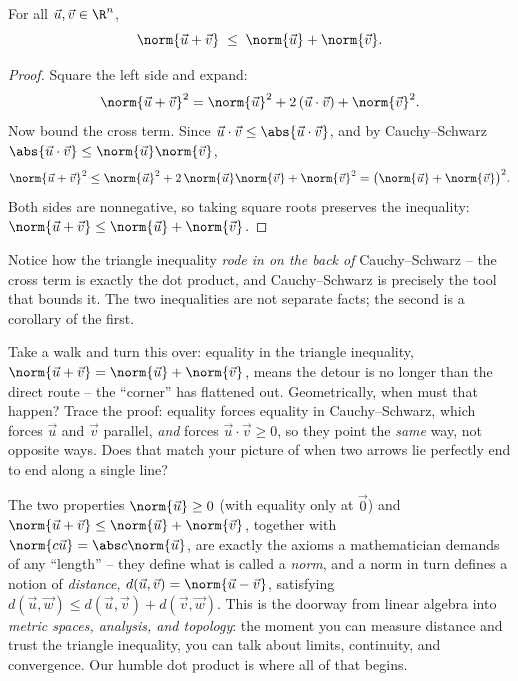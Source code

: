 \begin{theorem}\label{ch04:tri}
For all $\vec u,\vec v\in\R^n$,
\[
  \norm{\vec u + \vec v} \;\le\; \norm{\vec u} + \norm{\vec v}.
\]
\end{theorem}

\begin{proof}
Square the left side and expand:
\[
  \norm{\vec u+\vec v}^2
   = \norm{\vec u}^2 + 2\,(\vec u\cdot\vec v) + \norm{\vec v}^2.
\]
Now bound the cross term. Since $\vec u\cdot\vec v \le \abs{\vec u\cdot\vec v}$, and
by Cauchy--Schwarz $\abs{\vec u\cdot\vec v}\le\norm{\vec u}\norm{\vec v}$,
\[
  \norm{\vec u+\vec v}^2
   \le \norm{\vec u}^2 + 2\,\norm{\vec u}\norm{\vec v} + \norm{\vec v}^2
   = \bigl(\norm{\vec u} + \norm{\vec v}\bigr)^2.
\]
Both sides are nonnegative, so taking square roots preserves the inequality:
$\norm{\vec u+\vec v}\le\norm{\vec u}+\norm{\vec v}$.
\end{proof}

Notice how the triangle inequality \emph{rode in on the back of} Cauchy--Schwarz --
the cross term is exactly the dot product, and Cauchy--Schwarz is precisely the tool
that bounds it. The two inequalities are not separate facts; the second is a
corollary of the first.

\begin{walkbox}
Take a walk and turn this over: equality in the triangle inequality,
$\norm{\vec u+\vec v}=\norm{\vec u}+\norm{\vec v}$, means the detour is no longer than
the direct route -- the ``corner'' has flattened out. Geometrically, when must that
happen? Trace the proof: equality forces equality in Cauchy--Schwarz, which forces
$\vec u$ and $\vec v$ parallel, \emph{and} forces $\vec u\cdot\vec v\ge 0$, so they
point the \emph{same} way, not opposite ways. Does that match your picture of when
two arrows lie perfectly end to end along a single line?
\end{walkbox}

\begin{connectionbox}
The two properties $\norm{\vec u}\ge 0$ (with equality only at $\vec 0$) and
$\norm{\vec u+\vec v}\le\norm{\vec u}+\norm{\vec v}$, together with
$\norm{c\vec u}=\abs c\norm{\vec u}$, are exactly the axioms a mathematician demands
of any ``length'' -- they define what is called a \emph{norm}, and a norm in turn
defines a notion of \emph{distance}, $d(\vec u,\vec v) = \norm{\vec u-\vec v}$,
satisfying $d(\vec u,\vec w)\le d(\vec u,\vec v)+d(\vec v,\vec w)$. This is the
doorway from linear algebra into \emph{metric spaces, analysis, and topology}: the
moment you can measure distance and trust the triangle inequality, you can talk about
limits, continuity, and convergence. Our humble dot product is where all of that
begins.
\end{connectionbox}

